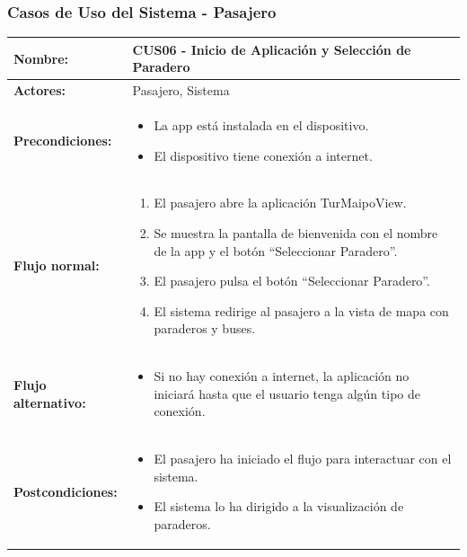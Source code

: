 \documentclass[12pt]{article}
\begin{document}
\clearpage
\subsubsection{Casos de Uso del Sistema - Pasajero}

    \begin{table}[!h]
    \centering
    \begin{tabular}{|p{3.5cm}|p{11cm}|}
    \hline
    \textbf{Nombre:} & CUS06 - Inicio de Aplicación y Selección de Paradero \\
    \hline
    \textbf{Actores:} & Pasajero, Sistema \\
    \hline
    \textbf{Precondiciones:} &
    \begin{itemize}
        \item La app está instalada en el dispositivo.
        \item El dispositivo tiene conexión a internet.
    \end{itemize}
    \\
    \hline
    \textbf{Flujo normal:} &
    \begin{enumerate}
        \item El pasajero abre la aplicación TurMaipoView.
        \item Se muestra la pantalla de bienvenida con el nombre de la app y el botón “Seleccionar Paradero”.
        \item El pasajero pulsa el botón “Seleccionar Paradero”.
        \item El sistema redirige al pasajero a la vista de mapa con paraderos y buses.
    \end{enumerate}
    \\
    \hline
    \textbf{Flujo alternativo:} &
    \begin{itemize}
        \item[2a.] Si no hay conexión a internet, la aplicación no iniciará hasta que el usuario tenga algún tipo de conexión.
    \end{itemize}
    \\
    \hline
    \textbf{Postcondiciones:} &
    \begin{itemize}
        \item El pasajero ha iniciado el flujo para interactuar con el sistema.
        \item El sistema lo ha dirigido a la visualización de paraderos.
    \end{itemize}
    \\
    \hline
    \end{tabular}
    \end{table}
\end{document}

